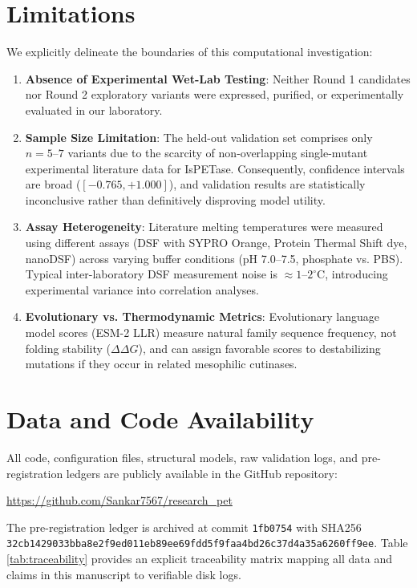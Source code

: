 \documentclass[11pt,a4paper]{article}
\begin{document}
\section{Limitations}

We explicitly delineate the boundaries of this computational investigation:
\begin{enumerate}
    \item \textbf{Absence of Experimental Wet-Lab Testing}: Neither Round 1 candidates nor Round 2 exploratory variants were expressed, purified, or experimentally evaluated in our laboratory.
    \item \textbf{Sample Size Limitation}: The held-out validation set comprises only $n = 5\text{--}7$ variants due to the scarcity of non-overlapping single-mutant experimental literature data for IsPETase. Consequently, confidence intervals are broad ($[-0.765, +1.000]$), and validation results are statistically inconclusive rather than definitively disproving model utility.
    \item \textbf{Assay Heterogeneity}: Literature melting temperatures were measured using different assays (DSF with SYPRO Orange, Protein Thermal Shift dye, nanoDSF) across varying buffer conditions (pH 7.0--7.5, phosphate vs. PBS). Typical inter-laboratory DSF measurement noise is $\approx 1\text{--}2^\circ\text{C}$, introducing experimental variance into correlation analyses.
    \item \textbf{Evolutionary vs. Thermodynamic Metrics}: Evolutionary language model scores (ESM-2 LLR) measure natural family sequence frequency, not folding stability ($\Delta\Delta G$), and can assign favorable scores to destabilizing mutations if they occur in related mesophilic cutinases.
\end{enumerate}

\section{Data and Code Availability}

All code, configuration files, structural models, raw validation logs, and pre-registration ledgers are publicly available in the GitHub repository:
\begin{center}
\url{https://github.com/Sankar7567/research_pet}
\end{center}
The pre-registration ledger is archived at commit \texttt{1fb0754} with SHA256 \texttt{32cb1429033bba8e2f9ed011eb89ee69fdd5f9faa4bd26c37d4a35a6260ff9ee}. Table \ref{tab:traceability} provides an explicit traceability matrix mapping all data and claims in this manuscript to verifiable disk logs.
\end{document}
